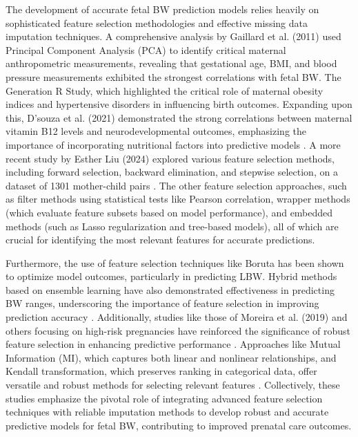 The development of accurate fetal BW prediction models relies heavily on sophisticated feature selection methodologies and effective missing data imputation techniques. A comprehensive analysis by Gaillard et al. (2011)\cite{11A} used Principal Component Analysis (PCA) to identify critical maternal anthropometric measurements, revealing that gestational age, BMI, and blood pressure measurements exhibited the strongest correlations with fetal BW. The Generation R Study, which highlighted the critical role of maternal obesity indices and hypertensive disorders in influencing birth outcomes. Expanding upon this, D'souza et al. (2021) demonstrated the strong correlations between maternal vitamin B12 levels and neurodevelopmental outcomes, emphasizing the importance of incorporating nutritional factors into predictive models \cite{12A}. A more recent study by Esther Liu (2024) explored various feature selection methods, including forward selection, backward elimination, and stepwise selection, on a dataset of 1301 mother-child pairs \cite{13A}. The other feature selection approaches, such as filter methods using statistical tests like Pearson correlation, wrapper methods (which evaluate feature subsets based on model performance), and embedded methods (such as Lasso regularization and tree-based models)\cite{14A}, all of which are crucial for identifying the most relevant features for accurate predictions. 

Furthermore, the use of feature selection techniques like Boruta has been shown to optimize model outcomes, particularly in predicting LBW. Hybrid methods based on ensemble learning have also demonstrated effectiveness in predicting BW ranges, underscoring the importance of feature selection in improving prediction accuracy \cite{15A}. Additionally, studies like those of Moreira et al. (2019) and others focusing on high-risk pregnancies have reinforced the significance of robust feature selection in enhancing predictive performance \cite{16A}. Approaches like Mutual Information (MI), which captures both linear and nonlinear relationships\cite{17A}, and Kendall transformation, which preserves ranking in categorical data, offer versatile and robust methods for selecting relevant features \cite{18A}. Collectively, these studies emphasize the pivotal role of integrating advanced feature selection techniques with reliable imputation methods to develop robust and accurate predictive models for fetal BW, contributing to improved prenatal care outcomes.

